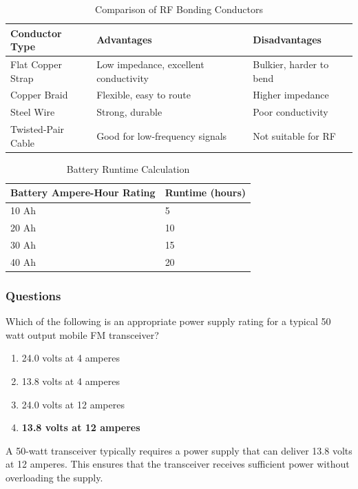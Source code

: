\begin{table}[h!]
    \centering
    \begin{tabular}{|l|l|l|}
        \hline
        \textbf{Conductor Type} & \textbf{Advantages} & \textbf{Disadvantages} \\
        \hline
        Flat Copper Strap & Low impedance, excellent conductivity & Bulkier, harder to bend \\
        Copper Braid & Flexible, easy to route & Higher impedance \\
        Steel Wire & Strong, durable & Poor conductivity \\
        Twisted-Pair Cable & Good for low-frequency signals & Not suitable for RF \\
        \hline
    \end{tabular}
    \caption{Comparison of RF Bonding Conductors}
    \label{tab:rf-bonding-conductors}
\end{table}

\begin{table}[h!]
    \centering
    \begin{tabular}{|l|l|}
        \hline
        \textbf{Battery Ampere-Hour Rating} & \textbf{Runtime (hours)} \\
        \hline
        10 Ah & 5 \\
        20 Ah & 10 \\
        30 Ah & 15 \\
        40 Ah & 20 \\
        \hline
    \end{tabular}
    \caption{Battery Runtime Calculation}
    \label{tab:battery-runtime-calculation}
\end{table}



\subsubsection*{Questions}

\begin{tcolorbox}[colback=gray!10!white,colframe=black!75!black,title={T4A01}]
    Which of the following is an appropriate power supply rating for a typical 50 watt output mobile FM transceiver?
    \begin{enumerate}[label=\Alph*),noitemsep]
        \item 24.0 volts at 4 amperes
        \item 13.8 volts at 4 amperes
        \item 24.0 volts at 12 amperes
        \item \textbf{13.8 volts at 12 amperes}
    \end{enumerate}
\end{tcolorbox}
A 50-watt transceiver typically requires a power supply that can deliver 13.8 volts at 12 amperes. This ensures that the transceiver receives sufficient power without overloading the supply.

